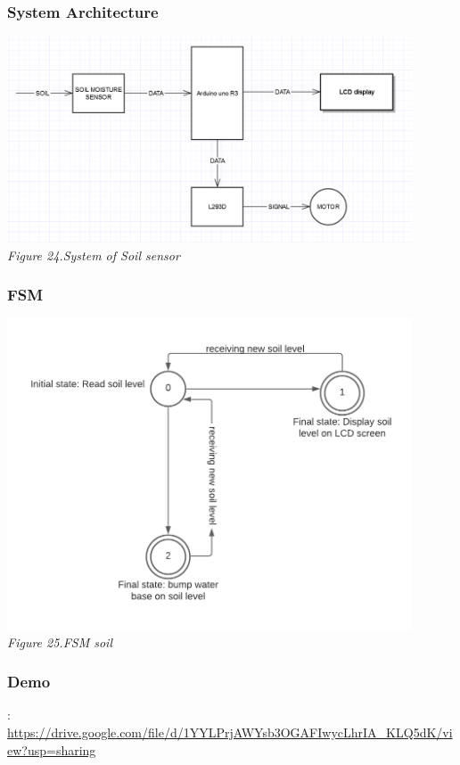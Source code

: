 \documentclass[a4paper]{article}
\begin{document}
\subsubsection{System Architecture}
\medskip
\begin{center}
    \includegraphics[width=12cm]{pictures/SA_Soil.png}\\
    \textit{Figure 24.System of Soil sensor}\\
\end{center}
\medskip
\subsubsection{FSM}
\medskip
\begin{center}
    \includegraphics[width=12cm]{pictures/fsm_soil.png}\\
    \textit{Figure 25.FSM soil}\\
\end{center}
\medskip
\subsubsection{Demo}
\text{[Source]}:\\
\url{https://drive.google.com/file/d/1YYLPrjAWYsb3OGAFIwycLhrIA_KLQ5dK/view?usp=sharing}
\end{document}
